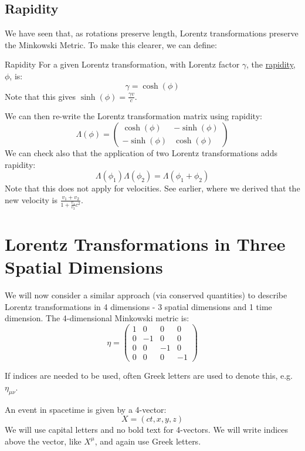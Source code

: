 \documentclass[../Main.tex]{subfiles}
\begin{document}
\subsection{Rapidity}
We have seen that, as rotations preserve length, Lorentz transformations preserve the Minkowski Metric. To make this clearer, we can define:
\begin{definition}{Rapidity}
    For a given Lorentz transformation, with Lorentz factor $\gamma$, the \underline{rapidity}, $\phi$, is:
    \begin{equation*}
        \gamma = \cosh(\phi)
    \end{equation*}
    Note that this gives $\sinh(\phi) = \frac{\gamma v}{c}$.
\end{definition}
We can then re-write the Lorentz transformation matrix using rapidity:
\begin{equation}
    \Lambda(\phi) =
    \begin{pmatrix}
        \cosh(\phi) & -\sinh(\phi) \\
        -\sinh(\phi) & \cosh(\phi)
    \end{pmatrix}
    \label{eqnRapidityMatrix}
\end{equation}
We can check also that the application of two Lorentz transformations adds rapidity:
\begin{equation*}
    \Lambda(\phi_1) \Lambda(\phi_2) = \Lambda(\phi_1 + \phi_2)
\end{equation*}
Note that this does not apply for velocities. See earlier, where we derived that the new velocity is $\frac{v_1 + v_2}{1 + \frac{v_1}{v_2}{c^2}}$.
\section{Lorentz Transformations in Three Spatial Dimensions}
We will now consider a similar approach (via conserved quantities) to describe Lorentz transformations in 4 dimensions - 3 spatial dimensions and 1 time dimension. The 4-dimensional Minkowski metric is:
\begin{equation*}
    \eta = 
    \begin{pmatrix}
        1&0&0&0\\
        0&-1&0&0\\
        0&0&-1&0\\
        0&0&0&-1
    \end{pmatrix}
\end{equation*}
\begin{remark}
    If indices are needed to be used, often Greek letters are used to denote this, e.g. $\eta_{\mu \nu}$.
\end{remark}
An event in spacetime is given by a 4-vector:
\begin{equation*}
    X = (ct, x, y, z)
\end{equation*}
We will use capital letters and no bold text for 4-vectors. We will write indices above the vector, like $X^\mu$, and again use Greek letters.
\end{document}
